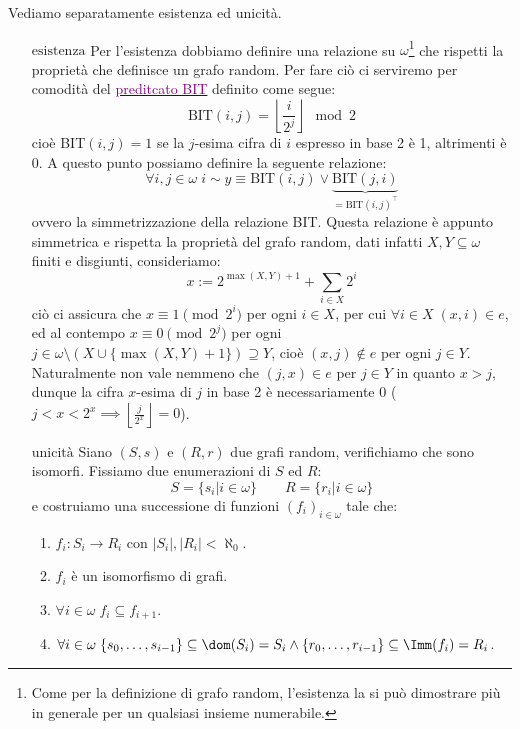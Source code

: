 \begin{soln}
	Vediamo separatamente esistenza ed unicità.
	\begin{itemize}
		\item[$\boxed{\text{esistenza}}$] Per l'esistenza dobbiamo definire una relazione su $\omega$\footnote{Come per la definizione di grafo random, l'esistenza la si può dimostrare più in generale per un qualsiasi insieme numerabile.} che rispetti la proprietà che definisce
		un grafo random. Per fare ciò ci serviremo per comodità del \href{https://en.wikipedia.org/wiki/BIT_predicate}{\textcolor{purple}{preditcato BIT}} definito come segue:
		\[ \text{BIT}(i,j) = \left\lfloor \frac{i}{2^j}\right\rfloor \mod 2
			\]
		cioè BIT$(i,j) = 1$ se la $j$-esima cifra di $i$ espresso in base 2 è 1, altrimenti è 0. A questo punto possiamo definire la seguente relazione:
		\[ \forall i,j \in \omega \; i \sim y \equiv \text{BIT}(i,j) \lor \underbrace{\text{BIT}(j,i)}_{= \text{BIT}(i,j)^\top}
			\]
		ovvero la simmetrizzazione della relazione BIT. Questa relazione è appunto simmetrica e rispetta la proprietà del grafo random, dati infatti $X,Y \subseteq \omega$ finiti e disgiunti, consideriamo:
		\[ x := 2^{\max(X,Y) + 1} + \sum_{i \in X} 2^i
			\]
		ciò ci assicura che $x \equiv 1 \pmod{2^i}$ per ogni $i \in X$, per cui $\forall i \in X \; (x,i) \in e$, ed al contempo $x \equiv 0 \pmod{2^j}$ per ogni $j \in \omega \setminus (X \cup \{\max(X,Y) + 1\}) \supseteq Y$, cioè $(x,j) \not \in e$ per ogni $j \in Y$.
		Naturalmente non vale nemmeno che $(j,x) \in e$ per $j \in Y$ in quanto $x > j$, dunque la cifra $x$-esima di $j$ in base 2 è necessariamente 0 ($j < x < 2^x \implies \left\lfloor \frac{j}{2^x}\right\rfloor = 0$).
		\item[$\boxed{\textrm{unicità}}$] Siano $(S,s)$ e $(R,r)$ due grafi random, verifichiamo che sono isomorfi. Fissiamo due enumerazioni di $S$ ed $R$:
		\[ S = \{s_i | i \in \omega\} \qquad R = \{r_i | i \in \omega\}
			\]
		e costruiamo una successione di funzioni $(f_i)_{i \in \omega}$ tale che:
		\begin{enumerate}[(1)]
			\item $f_i : S_i \to R_i$ con $|S_i|,|R_i| < \aleph_0$.
			\item $f_i$ è un isomorfismo di grafi.
			\item $\forall i \in \omega \; f_{i} \subseteq f_{i + 1}$.
			\item $\forall i \in \omega \; \{s_0,\ldots,s_{i-1}\} \subseteq \dom(S_i) = S_i \land \{r_0,\ldots,r_{i-1}\} \subseteq \Imm(f_i) = R_i$.
		\end{enumerate}

\end{itemize}
\end{soln}
